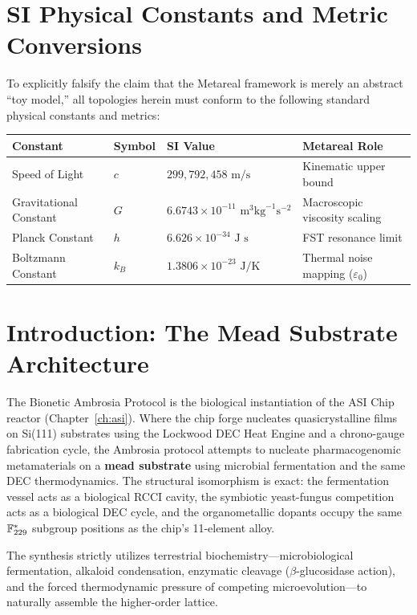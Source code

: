 \section*{SI Physical Constants and Metric Conversions}
To explicitly falsify the claim that the Metareal framework is merely an abstract ``toy model,'' all topologies herein must conform to the following standard physical constants and metrics:
\begin{table}[ht]
\centering
\renewcommand{\arraystretch}{1.2}
\begin{tabular}{@{}llll@{}}
\toprule
\textbf{Constant} & \textbf{Symbol} & \textbf{SI Value} & \textbf{Metareal Role} \\
\midrule
Speed of Light & $c$ & $299,792,458 \text{ m/s}$ & Kinematic upper bound \\
Gravitational Constant & $G$ & $6.6743 \times 10^{-11} \text{ m}^3 \text{kg}^{-1} \text{s}^{-2}$ & Macroscopic viscosity scaling \\
Planck Constant & $h$ & $6.626 \times 10^{-34} \text{ J s}$ & FST resonance limit \\
Boltzmann Constant & $k_B$ & $1.3806 \times 10^{-23} \text{ J/K}$ & Thermal noise mapping ($\varepsilon_0$) \\
\bottomrule
\end{tabular}
\end{table}

\section{Introduction: The Mead Substrate Architecture}
The Bionetic Ambrosia Protocol is the biological instantiation of the ASI Chip reactor (Chapter~\ref{ch:asi}). Where the chip forge nucleates quasicrystalline films on Si(111) substrates using the Lockwood DEC Heat Engine and a chrono-gauge fabrication cycle, the Ambrosia protocol attempts to nucleate pharmacogenomic metamaterials on a \textbf{mead substrate} using microbial fermentation and the same DEC thermodynamics. The structural isomorphism is exact: the fermentation vessel acts as a biological RCCI cavity, the symbiotic yeast-fungus competition acts as a biological DEC cycle, and the organometallic dopants occupy the same $\mathbb{F}_{229}^*$ subgroup positions as the chip's 11-element alloy.

The synthesis strictly utilizes terrestrial biochemistry---microbiological fermentation, alkaloid condensation, enzymatic cleavage ($\beta$-glucosidase action), and the forced thermodynamic pressure of competing microevolution---to naturally assemble the higher-order lattice.

